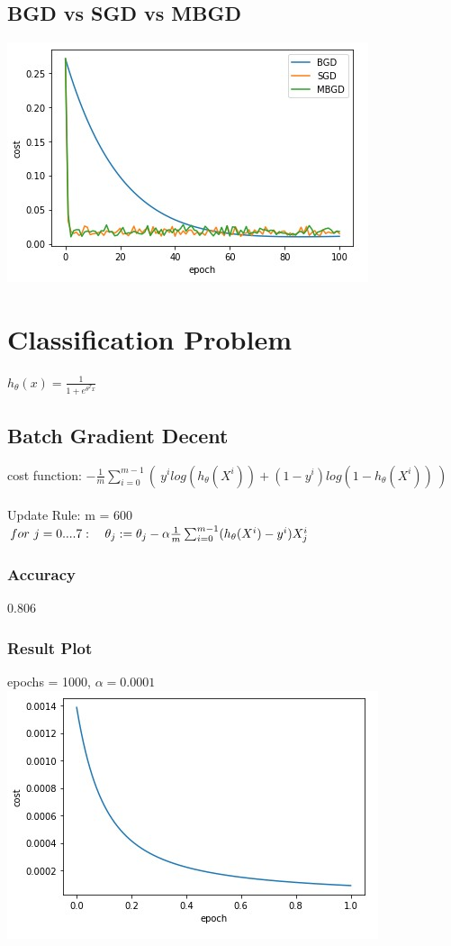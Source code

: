 \documentclass[10pt]{article}
\begin{document}
\subsection{BGD vs SGD vs MBGD}

\includegraphics[scale=.8]{mse}

\newpage





\section{Classification Problem}
    $h_{\theta}(x) = \frac{1}{1+e^{\theta^Tx}}$ 
\subsection{Batch Gradient Decent}
cost function:
    $-\frac{1}{m} \sum_{i=0}^{m-1}(~y^{i}log(h_{\theta}(X^{i})) +  (1-y^{i})log(1-h_{\theta}(X^{i}))~)$
    \\\\
Update Rule: m = 600\\
    $for~j=0....7:\\
    ~~~ \theta_{j} := \theta_{j} - \alpha \frac{1}{m} \sum_{i=0}^{m-1} (h_{\theta}(X^{i}) - y^{i}) X^{i}_{j}$
  
\subsubsection{Accuracy}
    0.806
    
\subsubsection{Result Plot}
epochs = 1000, $\alpha = 0.0001$\\

\includegraphics[scale=.6]{log_batch}
\end{document}
